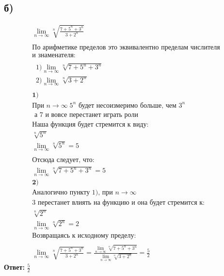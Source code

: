 \documentclass[a4paper,12pt]{article}
\begin{document}
\subsection*{б) }
\begin{equation*}
\begin{gathered}
\lim_{n\to\infty} \sqrt[n]{\frac{7+5^n+3^n}{3+2^n}}\\\\
\text{По арифметике пределов это эквивалентно пределам числителя}\\ \text{и знаменателя:}\\\\
\;\;1)\lim_{n\to\infty} \sqrt[n]{7+5^n+3^n} \\
\;\;2)\lim_{n\to\infty} \sqrt[n]{3+2^n} \\\\
\textbf{1)}\\
\text{При } n\to\infty \; 5^n \text{ будет несоизмеримо больше, чем } 3^n\\ \text{ а 7 и вовсе перестанет играть роли}\\
\text{Наша функция будет стремится к виду: }\\
\sqrt[n]{5^n} \\
\lim_{n\to\infty} \sqrt[n]{5^n} = 5\\\\
\text{Отсюда следует, что: }\\
\lim_{n\to\infty} \sqrt[n]{7+5^n+3^n} = 5\\
\textbf{2)}\\
\text{Аналогично пункту 1), при } n \to\infty\\ \text{3 перестанет влиять на функцию и она будет стремится к:}\\
\sqrt[n]{2^n} \\
\lim_{n\to\infty} \sqrt[n]{2^n} = 2\\
\text{Возвращаясь к исходному пределу:}\\\\
\lim_{n\to\infty} \sqrt[n]{\frac{7+5^n+3^n}{3+2^n}} = \frac{\lim_{n\to\infty} \sqrt[n]{7+5^n+3^n}}{\lim_{n\to\infty} \sqrt[n]{3+2^n}} = \frac{5}{2}
\end{gathered}
\end{equation*}
{\Large \textbf{Ответ: } $\frac{5}{2} $}
\end{document}
